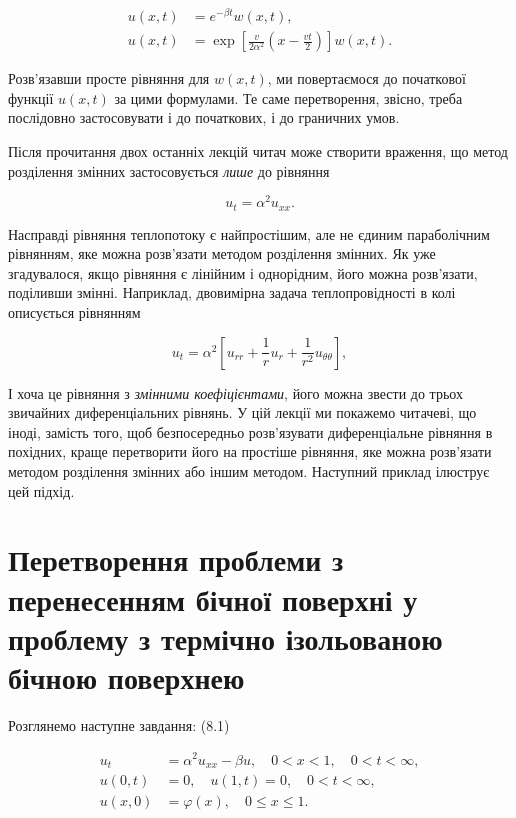\documentclass[
  ukrainian,
]{article}
\begin{document}
\[
\begin{aligned}
u(x,t)&=e^{-\beta t}w(x,t),\\
u(x,t)&=\exp\!\left[\frac{v}{2\alpha^2}\!\left(x-\frac{vt}{2}\right)\right]w(x,t).
\end{aligned}
\]

Розв'язавши просте рівняння для \(w(x,t)\), ми повертаємося до
початкової функції \(u(x,t)\) за цими формулами. Те саме перетворення,
звісно, треба послідовно застосовувати і до початкових, і до граничних
умов.

Після прочитання двох останніх лекцій читач може створити враження, що
метод розділення змінних застосовується \emph{лише} до рівняння

\[
u_t = \alpha^2 u_{xx}.
\]

Насправді рівняння теплопотоку є найпростішим, але не єдиним
параболічним рівнянням, яке можна розв'язати методом розділення змінних.
Як уже згадувалося, якщо рівняння є лінійним і однорідним, його можна
розв'язати, поділивши змінні. Наприклад, двовимірна задача
теплопровідності в колі описується рівнянням

\[
u_t = \alpha^2 \left[ u_{rr} + \frac{1}{r} u_r + \frac{1}{r^2} u_{\theta\theta} \right],
\]

І хоча це рівняння з \emph{змінними коефіцієнтами}, його можна звести до
трьох звичайних диференціальних рівнянь. У цій лекції ми покажемо
читачеві, що іноді, замість того, щоб безпосередньо розв'язувати
диференціальне рівняння в похідних, краще перетворити його на простіше
рівняння, яке можна розв'язати методом розділення змінних або іншим
методом. Наступний приклад ілюструє цей підхід.

\section{Перетворення проблеми з перенесенням бічної поверхні у проблему
з термічно ізольованою бічною
поверхнею}\label{ux43fux435ux440ux435ux442ux432ux43eux440ux435ux43dux43dux44f-ux43fux440ux43eux431ux43bux435ux43cux438-ux437-ux43fux435ux440ux435ux43dux435ux441ux435ux43dux43dux44fux43c-ux431ux456ux447ux43dux43eux457-ux43fux43eux432ux435ux440ux445ux43dux456-ux443-ux43fux440ux43eux431ux43bux435ux43cux443-ux437-ux442ux435ux440ux43cux456ux447ux43dux43e-ux456ux437ux43eux43bux44cux43eux432ux430ux43dux43eux44e-ux431ux456ux447ux43dux43eux44e-ux43fux43eux432ux435ux440ux445ux43dux435ux44e}

Розглянемо наступне завдання: (8.1)

\[
\begin{aligned}
u_{t} &= \alpha^{2}u_{xx} - \beta u, \quad 0 < x < 1, \quad 0 < t < \infty,\\
u(0, t) &= 0, \quad u(1, t) = 0, \quad 0 < t < \infty,\\
u(x, 0) &= \varphi(x), \quad 0 \le x \le 1.
\end{aligned}
\]
\end{document}
